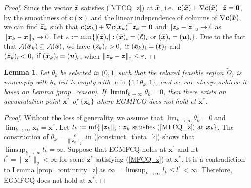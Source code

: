 \documentclass[aos]{imsart}
\numberwithin{equation}{section}
\theoremstyle{plain}
\newtheorem{lemma}{Lemma}
\begin{document}
\begin{appendix}
\begin{proof}
    Since the vector $\Bar{\bm{z}}$ satisfies (\ref{MFCQ_z}) at $\Bar{\bm{x}}$, i.e., $\bm{c}(\Bar{\bm{x}}) + \nabla \bm{c}(\Bar{\bm{x}})^{\top} \Bar{\bm{z}} = \bm{0}$, by the smoothness of $\bm{c}(\bm{x})$ and the linear independence of columns of $\nabla \bm{c}(\Bar{\bm{x}})$, we can find $\Bar{\bm{z}}_{k}$ such that $\bm{c}(\Bar{\bm{x}}_{k}) + \nabla \bm{c}(\Bar{\bm{x}}_{k})^{\top} \Bar{\bm{z}}_{k} = \bm{0}$ and  $\left\| \Bar{\bm{z}}_{k} - \Bar{\bm{z}}  \right\|_2 \to 0$ as $\left\| \Bar{\bm{x}}_{k}  - \Bar{\bm{x}}  \right\|_2 \to 0$. Let $\varepsilon := \min \{|(\Bar{\bm{z}})_i|: (\Bar{\bm{x}})_{i} = (\bm{\ell})_i~\text{or}~(\Bar{\bm{x}})_{i} = (\bm{u})_i\}$. Due to the fact that $\mathcal{A}(\Bar{\bm{x}}_{k}) \subseteq \mathcal{A}(\Bar{\bm{x}})$, we have $(\Bar{\bm{z}}_{k})_i >0,~\text{if}~(\Bar{\bm{x}}_{k})_{i} = (\bm{\ell})_i$ and $(\Bar{\bm{z}}_{k})_i < 0,~\text{if}~(\Bar{\bm{x}}_{k})_{i} = (\bm{u})_i$, when $\left\| \Bar{\bm{z}}_{k} - \Bar{\bm{z}} \right\|_2 \leq \varepsilon$. 
    
\end{proof}


\begin{lemma}
    Let $\theta_k$ be selected in $(0,1]$ such that the relaxed feasible region $\widetilde{\Omega}_k$ is nonempty with $\theta_k$ but is empty with $\min\{1.1\theta_k,1\}$, and we can always achieve it based on Lemma \ref{prop_reason}. If $\mathop{\lim \inf}_{k \to \infty} \theta_k = 0$, then there exists an accumulation point $\bm{x}^{*}$ of $\{\bm{x}_k\}$ where EGMFCQ does not hold at $\bm{x}^{*}$.
\end{lemma}


\begin{proof}
    Without the loss of generality, we assume that $\lim_{k \to \infty} \theta_k = 0$ and $\lim_{k \to \infty} \bm{x}_k = \bm{x}^{*}$. Let $l_k := \inf \{\|\bm{z}_k\|_2: \bm{z}_k~ \text{satisfies (\ref{MFCQ_z}) at}~ \bm{x}_k\}$. The construction of $\theta_k = \frac{\varepsilon}{\|\bm{z}_k\|_2}$ in (\ref{construct_theta_k}) shows that $\mathop{\lim \sup}_{k \to \infty} l_k = \infty$. Suppose that EGMFCQ holds at $\bm{x}^{*}$ and let $l^{*} = \|\bm{z}^{*}\|_2 < \infty$ for some $\bm{z}^{*}$ satisfying (\ref{MFCQ_z}) at $\bm{x}^{*}$. It is a contradiction to Lemma \ref{prop_continuity_z} as $\infty = \mathop{\lim \sup}_{k \to \infty} l_k \leq l^{*} < \infty$. Therefore, EGMFCQ does not hold at $\bm{x}^{*}$.
\end{proof}



\end{appendix}
\end{document}
